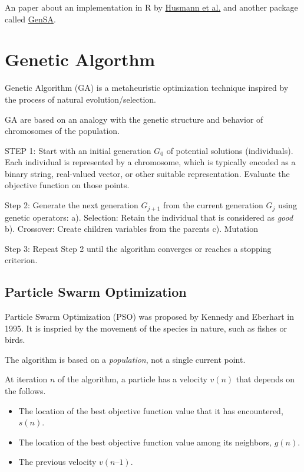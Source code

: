 \documentclass[
  letterpaper,
  DIV=11,
  numbers=noendperiod]{scrreprt}
\begin{document}
An paper about an implementation in R by
\href{https://www.maths.bris.ac.uk/R/web/packages/optimization/vignettes/vignette_master.pdf}{Husmann
et al.} and another package called
\href{https://cran.r-project.org/web/packages/GenSA/GenSA.pdf}{GenSA}.

\section{Genetic Algorthm}\label{genetic-algorthm}

Genetic Algorithm (GA) is a metaheuristic optimization technique
inspired by the process of natural evolution/selection.

GA are based on an analogy with the genetic structure and behavior of
chromosomes of the population.

STEP 1: Start with an initial generation \(G_0\) of potential solutions
(individuals). Each individual is represented by a chromosome, which is
typically encoded as a binary string, real-valued vector, or other
suitable representation. Evaluate the objective function on those
points.

Step 2: Generate the next generation \(G_{j+1}\) from the current
generation \(G_j\) using genetic operators: a). Selection: Retain the
individual that is considered as \emph{good} b). Crossover: Create
children variables from the parents c). Mutation

Step 3: Repeat Step 2 until the algorithm converges or reaches a
stopping criterion.

\subsection{Particle Swarm
Optimization}\label{particle-swarm-optimization}

Particle Swarm Optimization (PSO) was proposed by Kennedy and Eberhart
in 1995. It is inspried by the movement of the species in nature, such
as fishes or birds.

The algorithm is based on a \emph{population}, not a single current
point.

At iteration \(n\) of the algorithm, a particle has a velocity \(v(n)\)
that depends on the follows.

\begin{itemize}
\item
  The location of the best objective function value that it has
  encountered, \(s(n)\).
\item
  The location of the best objective function value among its neighbors,
  \(g(n)\).
\item
  The previous velocity \(v(n – 1)\).
\end{itemize}
\end{document}
